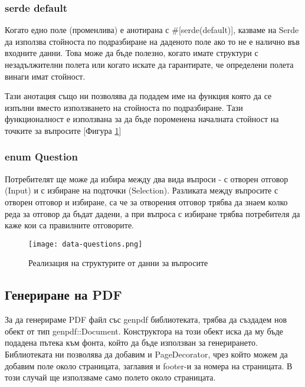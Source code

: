 \subsubsection{serde default}
Когато едно поле (променлива) е анотирана с \#[serde(default)], казваме на
Serde да използва стойноста по подразбиране на даденото поле ако то не е
налично във входните данни. Това може да бъде полезно, когато имате структури с
незадължителни полета или когато искате да гарантирате, че определени полета
винаги имат стойност. 

Тази анотация също ни позволява да подадем име на функция която да се изпълни
вместо използването на стойноста по подразбиране. Тази функционалност е използвана
за да бъде пороменена началната стойност на точките за въпросите [Фигура
\ref{fig:data-questions}]

\subsubsection{enum Question}
Потребителят ще може да избира между два вида въпроси - с отворен отговор
(Input) и с избиране на подточки (Selection). Разликата между въпросите с
отворен отговор и избиране, са че за отворения отговор трябва да знаем колко
реда за отговор да бъдат дадени, а при въпроса с избиране трябва потребителя да
каже кои са правилните отговорите.

\begin{figure}[!htb]
  \texttt{[image: data-questions.png]}
  \centering
  \caption{Реализация на структурите от данни за въпросите}
  \label{fig:data-questions}
\end{figure}

\subsection{Генериране на PDF}
За да генерираме PDF файл със genpdf библиотеката, трябва да създадем нов обект
от тип genpdf::Document. Конструктора на този обект иска да му бъде подадена
пътека към фонта, който да бъде използван за генерирането. Библиотеката ни
позволява да добавим и PageDecorator, чрез който можем да добавим поле около
страницата, заглавия и footer-и за номера на страницата. В този случай ще
използваме само полето около страницата.

